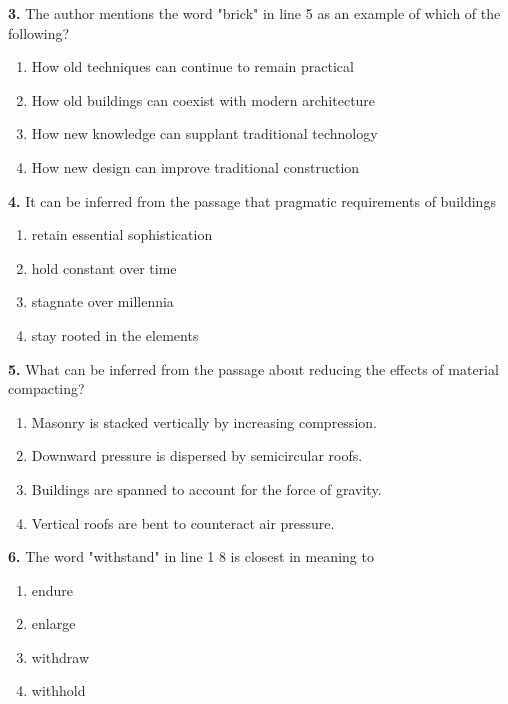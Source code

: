 \documentclass[12pt]{article}
\begin{document}
\par
\vspace{0.25\baselineskip}
\noindent\textbf{3.} The author mentions the word "brick" in line 5 as an example of which of the following?
\begin{enumerate}[label=(\Alph*),leftmargin=*,itemsep=0.2em]
\item How old techniques can continue to remain practical
\item How old buildings can coexist with modern architecture
\item How new knowledge can supplant traditional technology
\item How new design can improve traditional construction
\end{enumerate}
\par
\vspace{0.25\baselineskip}
\noindent\textbf{4.} It can be inferred from the passage that pragmatic requirements of buildings
\begin{enumerate}[label=(\Alph*),leftmargin=*,itemsep=0.2em]
\item retain essential sophistication
\item hold constant over time
\item stagnate over millennia
\item stay rooted in the elements
\end{enumerate}
\par
\vspace{0.25\baselineskip}
\noindent\textbf{5.} What can be inferred from the passage about reducing the effects of material compacting?
\begin{enumerate}[label=(\Alph*),leftmargin=*,itemsep=0.2em]
\item Masonry is stacked vertically by increasing compression.
\item Downward pressure is dispersed by semicircular roofs.
\item Buildings are spanned to account for the force of gravity.
\item Vertical roofs are bent to counteract air pressure.
\end{enumerate}
\par
\vspace{0.25\baselineskip}
\noindent\textbf{6.} The word "withstand" in line 1 8 is closest in meaning to
\begin{enumerate}[label=(\Alph*),leftmargin=*,itemsep=0.2em]
\item endure
\item enlarge
\item withdraw
\item withhold
\end{enumerate}
\end{document}
